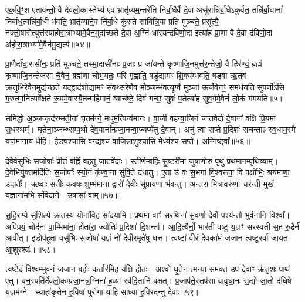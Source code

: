 ए॒क॒वि॒ꣳ॒श ए॒ताव॑न्तो॒ वै दे॑वलो॒कास्तेभ्य॑ ए॒व भ्रातृ॑व्यम॒न्तरे॑ति निर्बा॒धैर्वै दे॒वा असु॑रान्निर्बा॒धे॑\-ऽकुर्वत॒ तन्नि॑र्बा॒धानां᳚ निर्बाध॒त्वन्नि॑र्बा॒धी भ॑वति॒ भ्रातृ॑व्याने॒व नि॑र्बा॒धे कु॑रुते सावित्रि॒या प्रति॑ मुञ्चते॒ प्रसू᳚त्यै॒ नक्तो॒षासेत्युत्त॑रयाहोरा॒त्राभ्या॑\-मे॒वैन॒मुद्य॑च्छते दे॒वा अ॒ग्निं धा॑रयन्द्रविणो॒दा इत्या॑ह प्रा॒णा वै दे॒वा द्र॑विणो॒दा अ॑होरा॒त्राभ्या॑मे॒वैन॑मु॒द्यत्य॑॥५४॥

प्रा॒णैर्दा॑धा॒रासी॑नः॒ प्रति॑ मुञ्चते॒ तस्मा॒दासी॑नाः प्र॒जाः प्र जा॑यन्ते कृष्णाजि॒नमुत्त॑र॒न्तेजो॒ वै हिर॑ण्यं॒ ब्रह्म॑ कृष्णाजि॒नन्तेज॑सा चै॒वैनं॒ ब्रह्म॑णा चोभ॒यतः॒ परि॑ गृह्णाति॒ षडु॑द्यामꣳ शि॒क्य॑म्भवति॒ षड्वा ऋ॒तव॑ ऋ॒तुभि॑रे॒वैन॒मुद्य॑च्छते॒ यद्द्वाद॑शोद्यामꣳ संवथ्स॒रेणै॒व मौ॒ञ्जम्भ॑व॒त्यूर्ग्वै मुञ्जा॑ ऊ॒र्जैवैन॒ꣳ॒ सम॑र्धयति सुप॒र्णो॑\-ऽसि ग॒रुत्मा॒नित्यवे᳚क्षते रू॒पमे॒वास्यै॒तन्म॑हि॒मानं॒ व्याच॑ष्टे॒ दिवं॑ गच्छ॒ सुवः॑ प॒तेत्या॑ह सुव॒र्गमे॒वैनं॑ लो॒कं ग॑मयति॥५॥

{\anuvakamend[{रक्षा॒ꣳ॒स्यौदु॑म्बरी आदि॒त्य उ॒द्यत्य॒ स़ञ्चतु॑र्विꣳशतिश्च॥10॥}]}

समि॑द्धो अ॒ञ्जन्कृद॑रम्मती॒नां घृ॒तम॑ग्ने॒ मधु॑म॒त्पिन्व॑मानः। वा॒जी वह॑न्वा॒जिनं॑ जातवेदो दे॒वानां᳚ वक्षि प्रि॒यमा स॒धस्थम्᳚। घृ॒तेना॒ञ्जन्थ्सम्प॒थो दे॑व॒याना᳚न्प्रजा॒नन्वा॒ज्यप्ये॑तु दे॒वान्। अनु॑ त्वा सप्ते प्र॒दिशः॑ सचन्ताꣴ स्व॒धाम॒स्मै यज॑मानाय धेहि। ईड्य॒श्चासि॒ वन्द्य॑श्च वाजिन्ना॒शुश्चासि॒ मेध्य॑श्च सप्ते। अ॒ग्निष्ट्वा᳚॥५६॥

दे॒वैर्वसु॑भिः स॒जोषाः᳚ प्री॒तं वह्निं॑ वहतु जा॒तवे॑दाः। स्ती॒र्णम्ब॒र्\mbox{}हिः सु॒ष्टरी॑मा जुषा॒णोरु पृ॒थु प्रथ॑मानम्पृथि॒व्याम्। दे॒वेभि॑र्यु॒क्तमदि॑तिः स॒जोषाः᳚ स्यो॒नं कृ॑ण्वा॒ना सु॑वि॒ते द॑धातु। ए॒ता उ॑ वः सु॒भगा॑ वि॒श्वरू॑पा॒ वि पक्षो॑भिः॒ श्रय॑माणा॒ उदातैः᳚। ऋ॒ष्वाः स॒तीः क॒वषः॒ शुम्भ॑माना॒ द्वारो॑ दे॒वीः सु॑प्राय॒णा भ॑वन्तु। अ॒न्त॒रा मि॒त्रावरु॑णा॒ चर॑न्ती॒ मुखं॑ य॒ज्ञाना॑म॒भि सं॑विदा॒ने। उ॒षासा॑ वाम्॥५७॥

सु॒हि॒र॒ण्ये सु॑शि॒ल्पे ऋ॒तस्य॒ योना॑वि॒ह सा॑दयामि। प्र॒थ॒मा वाꣳ॑ सर॒थिना॑ सु॒वर्णा॑ दे॒वौ पश्य॑न्तौ॒ भुव॑नानि॒ विश्वा᳚। अपि॑प्रयं॒ चोद॑ना वा॒म्मिमा॑ना॒ होता॑रा॒ ज्योतिः॑ प्र॒दिशा॑ दि॒शन्ता᳚। आ॒दि॒त्यैर्नो॒ भार॑ती वष्टु य॒ज्ञꣳ सर॑स्वती स॒ह रु॒द्रैर्न॑ आवीत्। इडोप॑हूता॒ वसु॑भिः स॒जोषा॑ य॒ज्ञं नो॑ देवीर॒मृते॑षु धत्त। त्वष्टा॑ वी॒रं दे॒वका॑मं जजान॒ त्वष्टु॒रर्वा॑ जायत आ॒शुरश्वः॑।॥५८॥

त्वष्टे॒दं विश्व॒म्भुव॑नं जजान ब॒होः क॒र्तार॑मि॒ह य॑क्षि होतः। अश्वो॑ घृ॒तेन॒ त्मन्या॒ सम॑क्त॒ उप॑ दे॒वाꣳ ऋ॑तु॒शः पाथ॑ एतु। वन॒स्पति॑र्देवलो॒कम्प्र॑जा॒नन्न॒ग्निना॑ ह॒व्या स्व॑दि॒तानि॑ वक्षत्। प्र॒जाप॑ते॒स्तप॑सा वावृधा॒नः स॒द्यो जा॒तो द॑धिषे य॒ज्ञम॑ग्ने। स्वाहा॑कृतेन ह॒विषा॑ पुरोगा या॒हि सा॒ध्या ह॒विर॑दन्तु दे॒वाः॥५९॥

